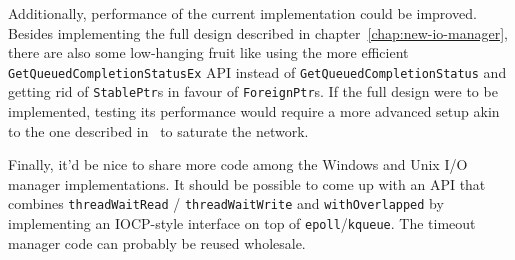 \documentclass[a4paper,11pt,oneside]{report}
\begin{document}
Additionally, performance of the current implementation could be
improved. Besides implementing the full design described in
chapter~\ref{chap:new-io-manager}, there are also some low-hanging fruit like
using the more efficient \texttt{GetQueuedCompletionStatusEx} API instead of
\texttt{GetQueuedCompletionStatus} and getting rid of \texttt{StablePtr}s in
favour of \texttt{ForeignPtr}s. If the full design were to be implemented,
testing its performance would require a more advanced setup akin to the one
described in~\cite{bib:voellmy} to saturate the network.

Finally, it'd be nice to share more code among the Windows and Unix I/O manager
implementations.  It should be possible to come up with an API that combines
\texttt{threadWaitRead} / \texttt{threadWaitWrite} and \texttt{withOverlapped}
by implementing an IOCP-style interface on top of
\texttt{epoll}/\texttt{kqueue}. The timeout manager code can probably be reused
wholesale.
\end{document}
